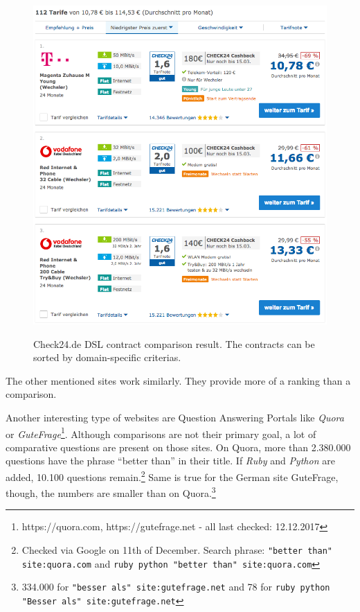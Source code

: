 \begin{figure}[h]
\includegraphics[width=1\textwidth,scale=0.8]{images/ds-sys/check24_2}
\label{img:check24_2}
\caption{Check24.de DSL contract comparison result. The contracts can be sorted by domain-specific criterias.}
\end{figure}

The other mentioned sites work similarly. They provide more of a ranking than a comparison.\newline


Another interesting type of websites are Question Answering Portals like \emph{Quora} or \emph{GuteFrage}\footnote{https://quora.com, https://gutefrage.net - all last checked: 12.12.2017}. Although comparisons are not their primary goal, a lot of comparative questions are present on those sites.
On Quora, more than 2.380.000 questions have the phrase \enquote{better than} in their title. If \emph{Ruby} and \emph{Python} are added, 10.100 questions remain.\footnote{Checked via Google on 11th of December. Search phrase: \texttt{"better than" site:quora.com} and \texttt{ruby python "better than" site:quora.com}}
Same is true for the German site GuteFrage, though, the numbers are smaller than on Quora.\footnote{334.000 for \texttt{"besser als" site:gutefrage.net} and 78 for \texttt{ruby python "Besser als" site:gutefrage.net}}\newline

